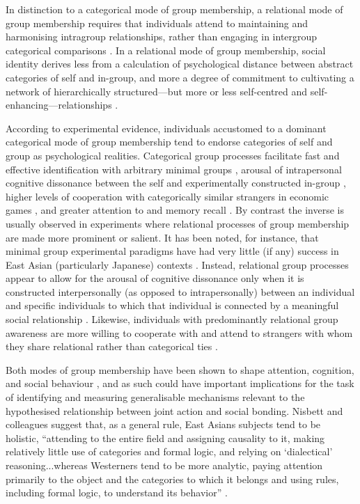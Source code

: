 \begin{CJK}{UTF8}{gbsn}
In distinction to a categorical mode of group membership, a relational mode of group membership requires that individuals attend to maintaining and harmonising intragroup relationships, rather than engaging in intergroup categorical comparisons \citep{Yuki2003}.  In a relational mode of group membership, social identity derives less from a calculation of psychological distance between abstract categories of self and in-group, and more a degree of commitment to cultivating a network of hierarchically structured---but more or less self-centred and self-enhancing---relationships \citep{Liu2009,Nisbett2003}.

According to experimental evidence, individuals accustomed to a dominant categorical mode of group membership tend to endorse categories of self and group as psychological realities.  Categorical group processes facilitate fast and effective identification with arbitrary minimal groups \citep{Diehl1990,VanBavel2014}, arousal of intrapersonal cognitive dissonance between the self and experimentally constructed in-group \citep{Festinger1957, Stone2001}, higher levels of cooperation with categorically similar strangers in economic games \citep{Yuki2005,Yuki2003}, and greater attention to and memory recall \citep{Buchan2006,Ng2016}.  By contrast the inverse is usually observed in experiments where relational processes of group membership are made more prominent or salient.  It has been noted, for instance, that minimal group experimental paradigms have had very little (if any) success in East Asian (particularly Japanese) contexts \citep[586]{Liu2009}.  Instead, relational group processes appear to allow for the arousal of cognitive dissonance only when it is constructed interpersonally (as opposed to intrapersonally) between an individual and specific individuals to which that individual is connected by a meaningful social relationship \citep{Hoshino-Browne2005}.  Likewise, individuals with predominantly relational group awareness are more willing to cooperate with and attend to strangers with whom they share relational rather than categorical ties \citep{Ng2016,Yuki2005}.

Both modes of group membership have been shown to shape attention, cognition, and social behaviour \citep{Nisbett2003}, and as such could have important implications for the task of identifying and measuring generalisable mechanisms relevant to the hypothesised relationship between joint action and social bonding.  Nisbett and colleagues suggest that, as a general rule, East Asians subjects tend to be holistic, ``attending to the entire field and assigning causality to it, making relatively little use of categories and formal logic, and relying on ‘dialectical’ reasoning...whereas Westerners tend to be more analytic, paying attention primarily to the object and the categories to which it belongs and using rules, including formal logic, to understand its behavior'' \citep[291]{Nisbett2001}.


\end{CJK}
